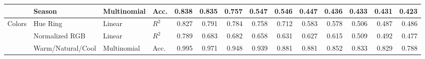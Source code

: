 \begin{table}[htbp]
{\begin{tabular}{ll ll rrrrrrrrrr}
 & Season & Multinomial & Acc. & 0.838 & 0.835 & 0.757 & 0.547 & 0.546 & 0.447 & 0.436 & 0.433 & 0.431 & 0.423 \\
\midrule
\multirow{3}{*}{Colors} & Hue Ring & Linear & $R^2$ & 0.827 & 0.791 & 0.784 & 0.758 & 0.712 & 0.583 & 0.578 & 0.506 & 0.487 & 0.486 \\
 & Normalized RGB & Linear & $R^2$ & 0.789 & 0.683 & 0.682 & 0.658 & 0.631 & 0.627 & 0.615 & 0.509 & 0.492 & 0.477 \\
 & Warm/Natural/Cool & Multinomial & Acc. & 0.995 & 0.971 & 0.948 & 0.939 & 0.881 & 0.881 & 0.852 & 0.833 & 0.829 & 0.788 \\
\bottomrule
\end{tabular}}%
\end{table}

